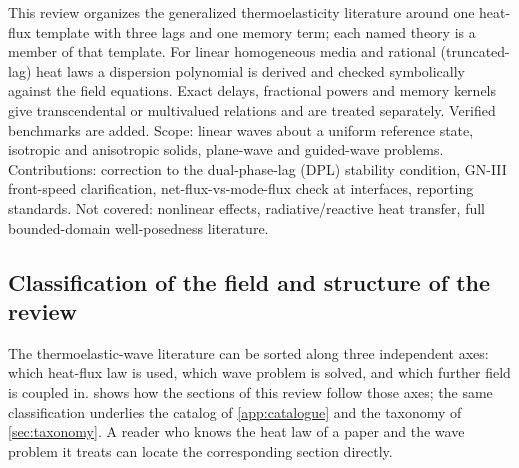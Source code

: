 \begin{summarybox}[Summary]
This review organizes the generalized thermoelasticity literature around one heat-flux template with three lags and one memory term; each named theory is a member of that template. For linear homogeneous media and rational (truncated-lag) heat laws a dispersion polynomial is derived and checked symbolically against the field equations. Exact delays, fractional powers and memory kernels give transcendental or multivalued relations and are treated separately. Verified benchmarks are added. Scope: linear waves about a uniform reference state, isotropic and anisotropic solids, plane-wave and guided-wave problems. Contributions: correction to the dual-phase-lag (DPL) stability condition, GN-III front-speed clarification, net-flux-vs-mode-flux check at interfaces, reporting standards. Not covered: nonlinear effects, radiative/reactive heat transfer, full bounded-domain well-posedness literature.
\end{summarybox}


\subsection{Classification of the field and structure of the review}\label{sec:classification}
The thermoelastic-wave literature can be sorted along three independent axes: which heat-flux law is used, which wave problem is solved, and which further field is coupled in.  shows how the sections of this review follow those axes; the same classification underlies the catalog of \cref{app:catalogue} and the taxonomy of \cref{sec:taxonomy}. A reader who knows the heat law of a paper and the wave problem it treats can locate the corresponding section directly.

